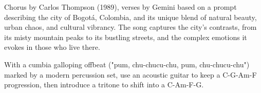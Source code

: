 

\begin{notes}
Chorus by Carlos Thompson (1989), verses by Gemini based on a prompt describing the city of Bogotá, Colombia, and its unique blend of natural beauty, urban chaos, and cultural vibrancy. %
The song captures the city's contrasts, from its misty mountain peaks to its bustling streets, and the complex emotions it evokes in those who live there.
\end{notes}
\begin{style}
With a cumbia galloping offbeat ("pum, chu-chucu-chu, pum, chu-chucu-chu") marked by a modern percussion set, use an acoustic guitar to keep a C-G-Am-F progression, then introduce a tritone to shift into a C-Am-F-G.
\end{style}
